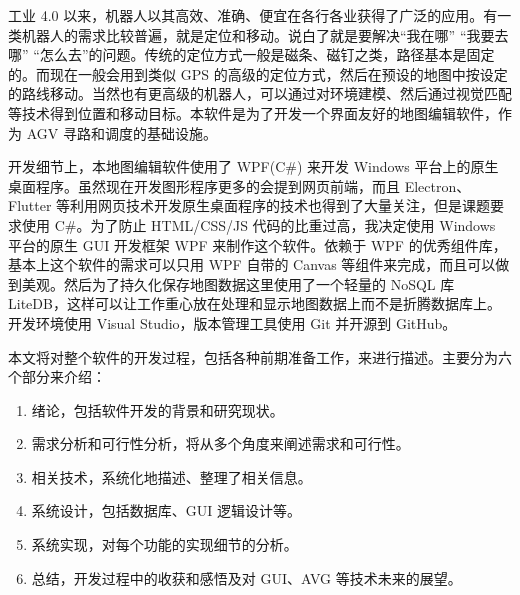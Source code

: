 
工业 4.0 以来，机器人以其高效、准确、便宜在各行各业获得了广泛的应用。有一类机器人的需求比较普遍，就是定位和移动。说白了就是要解决``我在哪'' ``我要去哪'' ``怎么去''的问题。传统的定位方式一般是磁条、磁钉之类，路径基本是固定的。而现在一般会用到类似 GPS 的高级的定位方式，然后在预设的地图中按设定的路线移动。当然也有更高级的机器人，可以通过对环境建模、然后通过视觉匹配等技术得到位置和移动目标。本软件是为了开发一个界面友好的地图编辑软件，作为 AGV 寻路和调度的基础设施。

开发细节上，本地图编辑软件使用了 WPF(C\#) 来开发 Windows 平台上的原生桌面程序。虽然现在开发图形程序更多的会提到网页前端，而且 Electron、Flutter 等利用网页技术开发原生桌面程序的技术也得到了大量关注，但是课题要求使用 C\#。为了防止 HTML/CSS/JS 代码的比重过高，我决定使用 Windows 平台的原生 GUI 开发框架 WPF 来制作这个软件。依赖于 WPF 的优秀组件库，基本上这个软件的需求可以只用 WPF 自带的 Canvas 等组件来完成，而且可以做到美观。然后为了持久化保存地图数据这里使用了一个轻量的 NoSQL 库 LiteDB，这样可以让工作重心放在处理和显示地图数据上而不是折腾数据库上。开发环境使用 Visual Studio，版本管理工具使用 Git 并开源到 GitHub\cite{url:ghrepo}。

本文将对整个软件的开发过程，包括各种前期准备工作，来进行描述。主要分为六个部分来介绍：

\begin{enumerate}
  \item 绪论，包括软件开发的背景和研究现状。
  \item 需求分析和可行性分析，将从多个角度来阐述需求和可行性。
  \item 相关技术，系统化地描述、整理了相关信息。
  \item 系统设计，包括数据库、GUI 逻辑设计等。
  \item 系统实现，对每个功能的实现细节的分析。
  \item 总结，开发过程中的收获和感悟及对 GUI、AVG 等技术未来的展望。
\end{enumerate}
